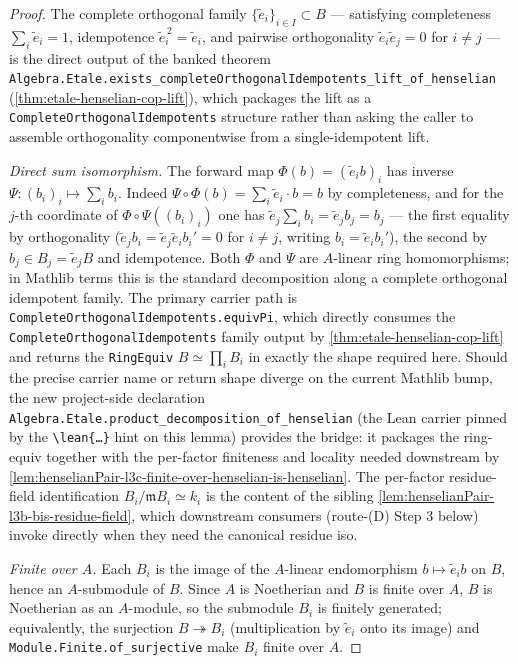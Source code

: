 \begin{proof}
The complete orthogonal family $\{\tilde e_i\}_{i \in I} \subset B$
— satisfying completeness $\sum_i \tilde e_i = 1$, idempotence
$\tilde e_i^{\,2} = \tilde e_i$, and pairwise orthogonality
$\tilde e_i \tilde e_j = 0$ for $i \ne j$ — is the direct output
of the banked theorem
\texttt{Algebra.Etale.exists\_completeOrthogonalIdempotents\_lift\_of\_henselian}
(\cref{thm:etale-henselian-cop-lift}), which packages the lift as
a \texttt{CompleteOrthogonalIdempotents} structure rather than
asking the caller to assemble orthogonality componentwise from a
single-idempotent lift.

\emph{Direct sum isomorphism.} The forward map
$\Phi(b) = (\tilde e_i b)_i$ has inverse
$\Psi : (b_i)_i \mapsto \sum_i b_i$. Indeed
$\Psi \circ \Phi(b) = \sum_i \tilde e_i \cdot b = b$ by
completeness, and for the $j$-th coordinate of
$\Phi \circ \Psi((b_i)_i)$ one has $\tilde e_j \sum_i b_i =
\tilde e_j b_j = b_j$ — the first equality by orthogonality
($\tilde e_j b_i = \tilde e_j \tilde e_i b_i' = 0$ for $i \ne j$,
writing $b_i = \tilde e_i b_i'$), the second by
$b_j \in B_j = \tilde e_j B$ and idempotence. Both $\Phi$ and
$\Psi$ are $A$-linear ring homomorphisms; in Mathlib terms this
is the standard decomposition along a complete orthogonal
idempotent family. The primary carrier path is
\texttt{CompleteOrthogonalIdempotents.equivPi}, which directly
consumes the \texttt{CompleteOrthogonalIdempotents} family output
by \cref{thm:etale-henselian-cop-lift} and returns the
\texttt{RingEquiv} $B \simeq \prod_i B_i$ in exactly the shape
required here. Should the precise carrier name or return shape
diverge on the current Mathlib bump, the new project-side
declaration
\texttt{Algebra.Etale.product\_decomposition\_of\_henselian} (the
Lean carrier pinned by the \texttt{\textbackslash lean\{\dots\}}
hint on this lemma) provides the bridge: it packages the
ring-equiv together with the per-factor finiteness and locality
needed downstream by
\cref{lem:henselianPair-l3c-finite-over-henselian-is-henselian}.
The per-factor residue-field identification
$B_i / \mathfrak m B_i \simeq k_i$ is the content of the sibling
\cref{lem:henselianPair-l3b-bis-residue-field}, which downstream
consumers (route-(D) Step 3 below) invoke directly when they
need the canonical residue iso.

\emph{Finite over $A$.} Each $B_i$ is the image of the $A$-linear
endomorphism $b \mapsto \tilde e_i b$ on $B$, hence an
$A$-submodule of $B$. Since $A$ is Noetherian and $B$ is finite
over $A$, $B$ is Noetherian as an $A$-module, so the submodule
$B_i$ is finitely generated; equivalently, the surjection
$B \twoheadrightarrow B_i$ (multiplication by $\tilde e_i$ onto
its image) and \texttt{Module.Finite.of\_surjective} make $B_i$
finite over $A$.


\end{proof}
